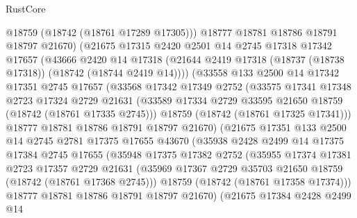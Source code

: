 \begin{lexlean}{RustCore}
\begin{coremodule}
                @18759
                (@18742 (@18761 @17289 @17305)))
              @18777
              @18781
              @18786
              @18791
              @18797
              @21670)
            (@21675
              @17315
              @2420
              @2501
              @14
              @2745
              @17318
              @17342
              @17657
              (@43666
                @2420
                @14
                @17318
                (@21644 @2419 @17318 (@18737 (@18738 @17318)) (@18742 (@18744 @2419 @14))))
              (@33558
                @133
                @2500
                @14
                @17342
                @17351
                @2745
                @17657
                (@33568
                  @17342
                  @17349
                  @2752
                  (@33575
                    @17341
                    @17348
                    @2723
                    @17324
                    @2729
                    @21631
                    (@33589 @17334 @2729 @33595 @21650 @18759 (@18742 (@18761 @17335 @2745)))
                    @18759
                    (@18742 (@18761 @17325 @17341)))
                  @18777
                  @18781
                  @18786
                  @18791
                  @18797
                  @21670)
                (@21675
                  @17351
                  @133
                  @2500
                  @14
                  @2745
                  @2781
                  @17375
                  @17655
                  @43670
                  (@35938
                    @2428
                    @2499
                    @14
                    @17375
                    @17384
                    @2745
                    @17655
                    (@35948
                      @17375
                      @17382
                      @2752
                      (@35955
                        @17374
                        @17381
                        @2723
                        @17357
                        @2729
                        @21631
                        (@35969 @17367 @2729 @35703 @21650 @18759 (@18742 (@18761 @17368 @2745)))
                        @18759
                        (@18742 (@18761 @17358 @17374)))
                      @18777
                      @18781
                      @18786
                      @18791
                      @18797
                      @21670)
                    (@21675
                      @17384
                      @2428
                      @2499
                      @14

\end{coremodule}
\end{lexlean}
